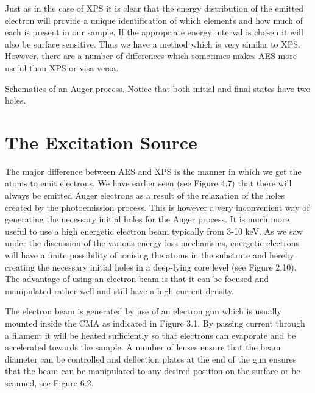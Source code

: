           Just as in the case of XPS  it  is  clear  that  the  energy
          distribution of the emitted electron will  provide  a  unique
          identification of which elements and how much of each is
          present in our sample. If the appropriate energy interval is
          chosen it will also be surface sensitive.  Thus  we  have  a
          method which is very  similar  to  XPS.  However,  there  are
          a number of differences  which  sometimes  makes  AES
          more useful than XPS or visa versa.


          \vspace*{14cm}

           Schematics of an  Auger  process.
          Notice that both initial and final states have two holes.\\


          \section{The Excitation Source}

          The major difference between AES and XPS is  the  manner  in
          which we get the atoms to emit electrons.  We  have  earlier
          seen (see Figure 4.7) that  there  will  always  be  emitted
          Auger electrons as a result of the relaxation of  the  holes
          created by the photoemission process. This is however a very
          inconvenient way of generating the necessary  initial  holes
          for the Auger process. It is much more  useful  to
          use a high energetic electron beam typically from 3-10  keV.
          As we saw under the discussion of the  various  energy  loss
          mechanisms,  energetic  electrons   will   have   a   finite
          possibility of ionising the  atoms  in  the  substrate  and
          hereby creating the necessary initial holes in a deep-lying
          core level (see Figure 2.10).  The  advantage  of  using  an
          electron beam is that it  can  be  focused  and  manipulated
          rather well and still have a high current density.

          The electron beam is generated by use  of  an  electron  gun
          which is usually mounted inside  the  CMA  as  indicated  in
          Figure 3.1. By passing current through a filament it will  be
          heated sufficiently so that electrons can evaporate  and  be
          accelerated towards the sample. A number  of  lenses  ensure
          that the beam diameter  can  be  controlled  and  deflection
          plates at the end of the gun ensures that the  beam  can  be
          manipulated to any desired position on  the  surface  or  be
          scanned, see Figure 6.2.\\

